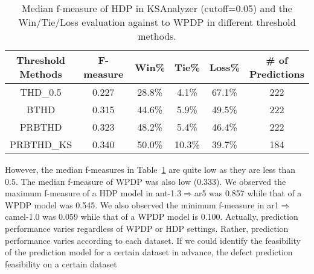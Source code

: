 \begin{table}[t]
\scriptsize
\centering
\caption{Median f-measure of HDP in KSAnalyzer (cutoff=0.05) and the Win/Tie/Loss evaluation against to WPDP in different threshold methods. 
}
\label{tab:threshold_result}
\begin{tabular}{|c||c||c|c|c||c|}
\hline

\specialcell{{\bf Threshold}\\{\bf Methods}}
& {\bf F-measure}
& {\bf Win}\%
& {\bf Tie}\% 
& {\bf Loss}\%
& \specialcell{{\bf \# of}\\{\bf Predictions}} \\ \hline \hline
THD\_0.5 & 0.227	& 28.8\% & 4.1\%	& 67.1\% & 222\\ \hline
BTHD & 0.315	& 44.6\% & 5.9\%	& 49.5\% & 222\\ \hline
PRBTHD & 0.323	& 48.2\% & 5.4\%	& 46.4\% & 222\\ \hline
PRBTHD\_KS& 0.340	& 50.0\% & 10.3\%	& 39.7\% & 184\\ \hline



\end{tabular}
\end{table}

However, the median f-measures in Table~\ref{tab:threshold_result} are quite low as they are less than 0.5. The median f-measure of WPDP was also low (0.333). We observed the maximum f-measure of a HDP model in ant-1.3$\Rightarrow$ar5 was 0.857 while that of a WPDP model was 0.545. We also observed the minimum f-measure in ar1$\Rightarrow$camel-1.0 was 0.059 while that of a WPDP model is 0.100. Actually, prediction performance varies regardless of WPDP or HDP settings. Rather, prediction performance varies according to each dataset. If we could identify the feasibility of the prediction model for a certain dataset in advance, the defect prediction feasibility on a certain dataset


